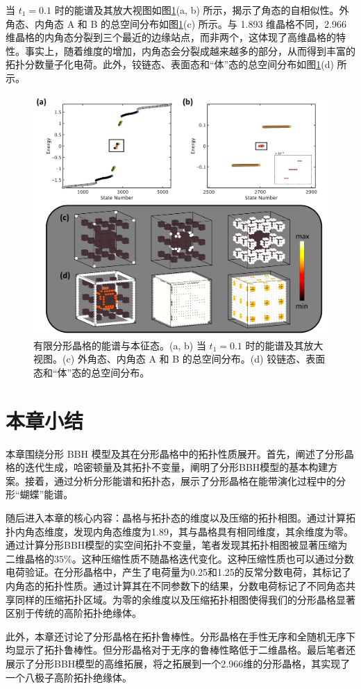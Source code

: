 当 \( t_1=0.1 \) 时的能谱及其放大视图如图\ref{fig:3DState}(a, b) 所示，揭示了角态的自相似性。外角态、内角态 A 和 B 的总空间分布如图\ref{fig:3DState}(c) 所示。与 1.893 维晶格不同，2.966 维晶格的内角态分裂到三个最近的边缘站点，而非两个，这体现了高维晶格的特性。事实上，随着维度的增加，内角态会分裂成越来越多的部分，从而得到丰富的拓扑分数量子化电荷。此外，铰链态、表面态和“体”态的总空间分布如图\ref{fig:3DState}(d) 所示。
\begin{figure}[htbp]
    \centering
    \includegraphics[width=0.75\linewidth]{figure/HOTITheo/3DState.png}
    \caption{有限分形晶格的能谱与本征态。(a, b) 当 \( t_1=0.1 \) 时的能谱及其放大视图。(c) 外角态、内角态 A 和 B 的总空间分布。(d) 铰链态、表面态和“体”态的总空间分布。}
    \label{fig:3DState}
\end{figure}

\section{本章小结}
本章围绕分形 BBH 模型及其在分形晶格中的拓扑性质展开。首先，阐述了分形晶格的迭代生成，哈密顿量及其拓扑不变量，阐明了分形BBH模型的基本构建方案。接着，通过分析分形能谱和拓扑态，展示了分形晶格在能带演化过程中的分形“蝴蝶”能谱。

随后进入本章的核心内容：晶格与拓扑态的维度以及压缩的拓扑相图。通过计算拓扑内角态维度，发现内角态维度为1.89，其与晶格具有相同维度，其余维度为零。通过计算分形BBH模型的实空间拓扑不变量，笔者发现其拓扑相图被显著压缩为二维晶格的$35\%$。这种压缩性质不随晶格迭代变化。这种压缩性质也可以通过分数电荷验证。在分形晶格中，产生了电荷量为0.25和1.25的反常分数电荷，其标记了内角态的拓扑性质。通过计算其在不同参数下的结果，分数电荷标记了不同角态共享同样的压缩拓扑区域。为零的余维度以及压缩拓扑相图使得我们的分形晶格显著区别于传统的高阶拓扑绝缘体。

此外，本章还讨论了分形晶格在拓扑鲁棒性。分形晶格在手性无序和全随机无序下均显示了拓扑鲁棒性。但分形晶格对于无序的鲁棒性略低于二维晶格。最后笔者还展示了分形BBH模型的高维拓展，将之拓展到一个2.966维的分形晶格，其实现了一个八极子高阶拓扑绝缘体。
